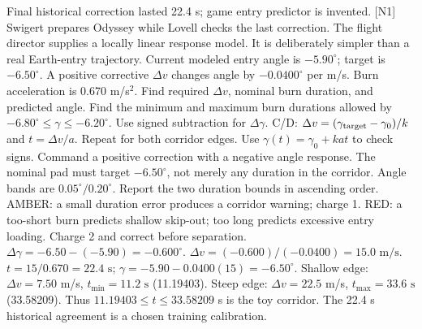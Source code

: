 {Final historical correction lasted 22.4 s; game entry predictor is invented. [N1]}
{Swigert prepares Odyssey while Lovell checks the last correction.
The flight director supplies a locally linear response model.
It is deliberately simpler than a real Earth-entry trajectory.}
{Current modeled entry angle is \(-5.90^\circ\); target is
\(-6.50^\circ\). A positive corrective \(\Delta v\) changes angle by
\(-0.0400^\circ\) per m/s. Burn acceleration is 0.670 m/s\(^{2}\).
Find required \(\Delta v\), nominal burn duration, and predicted angle.
Find the minimum and maximum burn durations allowed by
\(-6.80^\circ\leq\gamma\leq-6.20^\circ\).}
{Use signed subtraction for \(\Delta\gamma\).
C/D: \(\Delta v=(\gamma_{\rm target}-\gamma_0)/k\) and
\(t=\Delta v/a\).
Repeat for both corridor edges.
Use \(\gamma(t)=\gamma_0+kat\) to check signs.}
{Command a positive correction with a negative angle response.
The nominal pad must target \(-6.50^\circ\), not merely any
duration in the corridor. Angle bands are \(0.05^\circ/0.20^\circ\).
Report the two duration bounds in ascending order.}
{AMBER: a small duration error produces a corridor warning; charge 1.
RED: a too-short burn predicts shallow skip-out; too long predicts
excessive entry loading. Charge 2 and correct before separation.}
{\(\Delta\gamma=-6.50-(-5.90)=-0.600^\circ\).
\(\Delta v=(-0.600)/(-0.0400)=\boxed{15.0\text{ m/s}}\).
\(t=15/0.670=\boxed{22.4\text{ s}}\);
\(\gamma=-5.90-0.0400(15)=\boxed{-6.50^\circ}\).
Shallow edge: \(\Delta v=7.50\) m/s,
\(t_{\min}=\boxed{11.2\text{ s}}\) (11.19403).
Steep edge: \(\Delta v=22.5\) m/s,
\(t_{\max}=\boxed{33.6\text{ s}}\) (33.58209).
Thus \(11.19403\leq t\leq33.58209\) s is the toy corridor.
The 22.4 s historical agreement is a chosen training calibration.}

